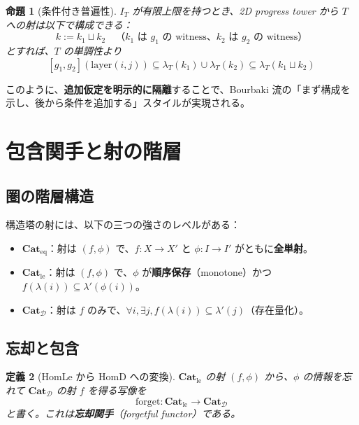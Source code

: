 \documentclass[a4paper,12pt]{ltjsarticle}
\newtheorem{definition}{定義}[section]
\newtheorem{proposition}[definition]{命題}
\theoremstyle{definition}
\begin{document}
\begin{proposition}[条件付き普遍性]
$I_T$ が有限上限を持つとき、2D progress tower から $T$ への射は以下で構成できる：
\[
k := k_1 \sqcup k_2 \quad \text{（$k_1$ は $g_1$ の witness、$k_2$ は $g_2$ の witness）}
\]
とすれば、$T$ の単調性より
\[
[g_1, g_2](\text{layer}(i, j)) \subseteq \lambda_T(k_1) \cup \lambda_T(k_2) \subseteq \lambda_T(k_1 \sqcup k_2)
\]
\end{proposition}

このように、\textbf{追加仮定を明示的に隔離}することで、Bourbaki 流の「まず構成を示し、後から条件を追加する」スタイルが実現される。

\section{包含関手と射の階層}

\subsection{圏の階層構造}

構造塔の射には、以下の三つの強さのレベルがある：

\begin{center}
\end{center}

\begin{itemize}
    \item $\mathbf{Cat}_{\mathrm{eq}}$：射は $(f, \phi)$ で、$f : X \to X'$ と $\phi : I \to I'$ がともに\textbf{全単射}。
    \item $\mathbf{Cat}_{\mathrm{le}}$：射は $(f, \phi)$ で、$\phi$ が\textbf{順序保存}（monotone）かつ $f(\lambda(i)) \subseteq \lambda'(\phi(i))$。
    \item $\mathbf{Cat}_{\mathcal{D}}$：射は $f$ のみで、$\forall i, \exists j, f(\lambda(i)) \subseteq \lambda'(j)$（存在量化）。
\end{itemize}

\subsection{忘却と包含}

\begin{definition}[HomLe から HomD への変換]
$\mathbf{Cat}_{\mathrm{le}}$ の射 $(f, \phi)$ から、$\phi$ の情報を忘れて $\mathbf{Cat}_{\mathcal{D}}$ の射 $f$ を得る写像を
\[
\mathrm{forget} : \mathbf{Cat}_{\mathrm{le}} \to \mathbf{Cat}_{\mathcal{D}}
\]
と書く。これは\textbf{忘却関手}（forgetful functor）である。
\end{definition}
\end{document}
